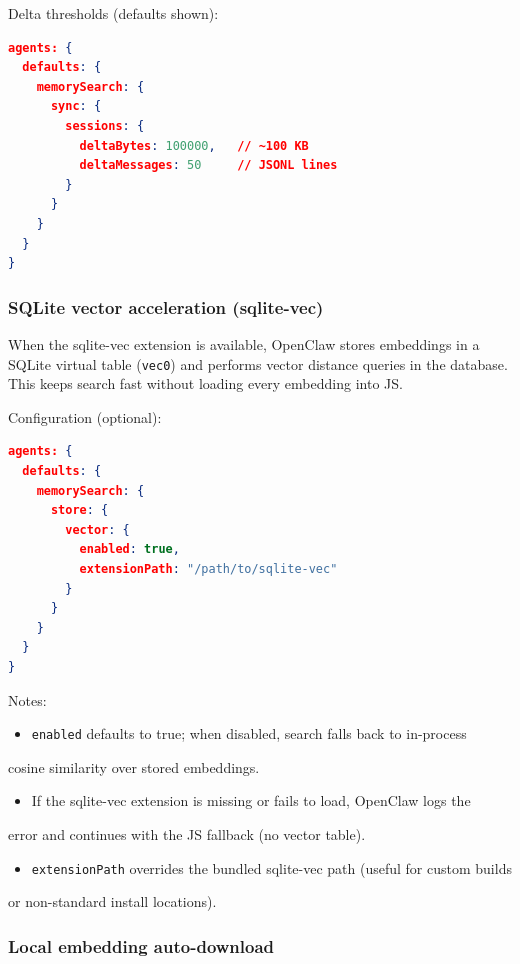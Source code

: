 Delta thresholds (defaults shown):

\begin{lstlisting}[language=json]
agents: {
  defaults: {
    memorySearch: {
      sync: {
        sessions: {
          deltaBytes: 100000,   // ~100 KB
          deltaMessages: 50     // JSONL lines
        }
      }
    }
  }
}
\end{lstlisting}


\subsubsection{SQLite vector acceleration (sqlite-vec)}


When the sqlite-vec extension is available, OpenClaw stores embeddings in a
SQLite virtual table (\texttt{vec0}) and performs vector distance queries in the
database. This keeps search fast without loading every embedding into JS.

Configuration (optional):

\begin{lstlisting}[language=json]
agents: {
  defaults: {
    memorySearch: {
      store: {
        vector: {
          enabled: true,
          extensionPath: "/path/to/sqlite-vec"
        }
      }
    }
  }
}
\end{lstlisting}


Notes:

\begin{itemize}
  \item \texttt{enabled} defaults to true; when disabled, search falls back to in-process
\end{itemize}

cosine similarity over stored embeddings.
\begin{itemize}
  \item If the sqlite-vec extension is missing or fails to load, OpenClaw logs the
\end{itemize}

error and continues with the JS fallback (no vector table).
\begin{itemize}
  \item \texttt{extensionPath} overrides the bundled sqlite-vec path (useful for custom builds
\end{itemize}

or non-standard install locations).

\subsubsection{Local embedding auto-download}


